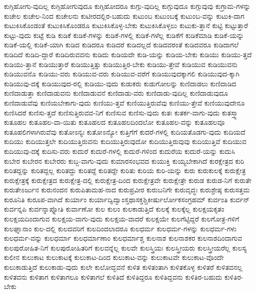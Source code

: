 {ಕುಗ್ಗಿಹೋಗು-ವುದಿಲ್ಲ
ಕುಗ್ಗಿಹೋಗುವುದೂ
ಕುಗ್ಗಿಹೋದರೂ
ಕುಗ್ಗು-ವುದಿಲ್ಲ
ಕುಗ್ಗುವುದೂ
ಕುಗ್ಗುವುವು
ಕುಗ್ರಾಮ-ಗಳನ್ನು
ಕುಚೇಲ
ಕುಚೇಲ-ನಿಂದ
ಕುಚೇಲನು
ಕುಟೀರದಲ್ಲಿರ-ಬಹುದು
ಕುಟುಂಬ
ಕುಟುಂಬಕ್ಕೆ
ಕುಟುಂಬ-ವನ್ನು
ಕುಟುಕಿ-ದಾಗ
ಕುಟುಕಿಸಿಕೊಂಡಂತೆ
ಕುಟುಕಿಸಿಕೊಂಡರೂ
ಕುಟುಕಿಸಿಕೊಳ್ಳ-ಬೇಕು
ಕುಟುಕಿಸಿಕೊಳ್ಳಲು
ಕುಟುಕು-ತ್ತಾನೆ
ಕುಟ್ಟಿ
ಕುಟ್ಟುತ್ತಾರೆ
ಕುಟ್ಟು-ವುದು
ಕುಟ್ಟೆ
ಕುಡಿ
ಕುಡಿಕೆ
ಕುಡಿಕೆ-ಗಳನ್ನು
ಕುಡಿಕೆ-ಗಳಲ್ಲಿ
ಕುಡಿಕೆ-ಗಳೆಲ್ಲ
ಕುಡಿಕೆಗೆ
ಕುಡಿಕೆಮಾಡಿ
ಕುಡಿಕೆ-ಯನ್ನು
ಕುಡಿಕೆ-ಯಲ್ಲಿ
ಕುಡಿಕೆ-ಯಾಗಿ
ಕುಡಿದ
ಕುಡಿದರೂ
ಕುಡಿದರೆ
ಕುಡಿದಲ್ಲದೆ
ಕುಡಿದವರಂತೆ
ಕುಡಿದವರೂ
ಕುಡಿದಾಗಲೆ
ಕುಡಿದಿದೆ
ಕುಡಿದಿ-ದ್ದಾರೆ
ಕುಡಿದಿರುವವನು
ಕುಡಿದು
ಕುಡಿಯದೇ
ಕುಡಿ-ಯನ್ನು
ಕುಡಿಯ-ಬೇಕು
ಕುಡಿಯು
ಕುಡಿಯು-ತ್ತದೆ
ಕುಡಿಯು-ತ್ತಾನೆ
ಕುಡಿಯುತ್ತಾರೆ
ಕುಡಿಯುತ್ತಿತ್ತು
ಕುಡಿಯುತ್ತಿರ-ಬೇಕು
ಕುಡಿಯು-ತ್ತೇವೆ
ಕುಡಿಯುವ
ಕುಡಿಯುವನು
ಕುಡಿಯುವನೊ
ಕುಡಿಯು-ವರು
ಕುಡಿಯುವ-ವರು
ಕುಡಿಯುವ-ವರೆಗೆ
ಕುಡಿಯುವುದಕ್ಕಾಗಲಿ
ಕುಡಿಯುವುದ-ಕ್ಕಾಗಿ
ಕುಡಿಯುವು-ದಕ್ಕೆ
ಕುಡಿಯುವುದ-ರಲ್ಲಿ
ಕುಡಿಯು-ವುದು
ಕುಡುಕರು
ಕುಡುಗೋಲನ್ನು
ಕುಣಿದಾಡಲು
ಕುಣಿದಾಡಿದ
ಕುಣಿದಾಡುತ್ತಾ
ಕುಣಿದಾಡುವನು
ಕುಣಿದಾಡುವನೆ
ಕುಣಿದಾಡು-ವರು
ಕುಣಿದಾಡು-ವುದಿಲ್ಲ
ಕುಣಿದಾಡುವುದೂ
ಕುಣಿದಾಡುವೆವು
ಕುಣಿಯಬೇಕಾಗು-ವುದು
ಕುಣಿಯು-ತ್ತವೆ
ಕುಣಿಯುತ್ತಿರುವೆವು
ಕುಣಿಯು-ತ್ತೇವೆ
ಕುಣಿಯುವುದೇನೂ
ಕುಣಿಸಿದರೆ
ಕುಣಿಸು-ತ್ತದೆ
ಕುಣಿಸುತ್ತಿರುವವ-ನಿಗೆ
ಕುಣಿಸುವ
ಕುಣಿಸು-ವುದು
ಕುತಃ
ಕುತರ್ಕ-ವಾಗು-ವುದು
ಕುತಸ್ತ್ವಾ
ಕುತೂಹಲ
ಕುತೂಹಲ-ವಾ-ಯಿತು
ಕುತೂಹಲದ
ಕುತೂಹಲದಿಂದಲೋ
ಕುತೂಹಲ-ವನ್ನು
ಕುತೂಹಲವೂ
ಕುತೂಹಲಿಗಳಾಗಿರುವೆವು
ಕುತೋಽನ್ಯಃ
ಕುತೋಽನ್ಯೋ
ಕುತ್ತಿಗೆಗೆ
ಕುದರೆ-ಗಳಲ್ಲಿ
ಕುದಿಯತೊಡಗು-ವುದು
ಕುದಿಯದೆ
ಕುದಿಯು
ಕುದಿಯುತ್ತಲೇ
ಕುದಿಯುತ್ತಿರುವನು
ಕುದಿಯುತ್ತಿರುವುದೋ
ಕುದಿಯುತ್ತಿರುವುವು
ಕುದಿಯುತ್ತಿವೆ
ಕುದಿಯುವ
ಕುದಿಯುವು-ದಕ್ಕೆ
ಕುದಿಸು-ವರು
ಕುದುರೆ
ಕುದುರೆ-ಗಳಲ್ಲಿ
ಕುದುರೆ-ಗಳಿಂದ
ಕುದುರೆಯ
ಕುದುರೆ-ಯನ್ನು
ಕುದುಸಿ
ಕುಬೇರ
ಕುಬೇರನ
ಕುಬೇರರು
ಕುಬ್ಜ-ವಾಗು-ವುದು
ಕುಮಾರಸಂಭವದ
ಕುಯುಕ್ತಿ
ಕುಯ್ಯಬೇಕಾಗಿದೆ
ಕುರಕ್ಷೇತ್ರದ
ಕುರಿ
ಕುರಿತದ್ದನ್ನು
ಕುರಿತದ್ದಲ್ಲ
ಕುರಿತದ್ದು
ಕುರಿತದ್ದೆ
ಕುರಿತದ್ದೇ
ಕುರಿತು
ಕುರಿಯ
ಕುರಿ-ಯನ್ನು
ಕುರು
ಕುರುಕುಲಕ್ಕೆ
ಕುರುಕ್ಷೇತ್ರ
ಕುರುಕ್ಷೇತ್ರಕ್ಕೆ
ಕುರುಕ್ಷೇತ್ರದ
ಕುರುಕ್ಷೇತ್ರ-ದಲ್ಲಿ
ಕುರುಕ್ಷೇತ್ರ-ದಿಂದ
ಕುರುಕ್ಷೇತ್ರವೇ
ಕುರುಕ್ಷೇತ್ರೇ
ಕುರುಡ
ಕುರುಡ-ನಿಗೆ
ಕುರುತೇ
ಕುರುತೇಽರ್ಜುನ
ಕುರುನಂದನ
ಕುರುಪಿತಾಮಹ-ನಾದ
ಕುರುಪ್ರವೀರ
ಕುರುಬನಿಗೇ
ಕುರುವೃದ್ಧಃ
ಕುರುಶ್ರೇಷ್ಠ
ಕುರುಸತ್ತಮ
ಕುರೂನಿತಿ
ಕುರೂಪ-ವಾಗಿದೆ
ಕುರ್ಯಾಂ
ಕುರ್ಯಾದ್ವಿದ್ವಾಂಸ್ತಥಾಸಕ್ತಶ್ಚಿಕೀರ್ಷುರ್ಲೋಕಸಂಗ್ರಹಮ್
ಕುರ್ವಂತಿ
ಕುರ್ವನ್
ಕುರ್ವನ್ನಪಿ
ಕುರ್ವನ್ನಾಪ್ನೋತಿ
ಕುರ್ವಾಣೋ
ಕುಲ
ಕುಲಂ
ಕುಲಕಾಡುತ್ತಿದೆ
ಕುಲಕ್ಕೆ
ಕುಲಕ್ಕೆಲ್ಲ
ಕುಲಕ್ಷಯಕೃತಂ
ಕುಲಕ್ಷಯದಿಂದಾಗುವ
ಕುಲಕ್ಷಯ-ವಾಗು-ವುದು
ಕುಲಕ್ಷಯ-ವಾದರೆ
ಕುಲಕ್ಷಯೇ
ಕುಲಗೆಟ್ಟಿದ್ದರೆ
ಕುಲಗೋತ್ರ-ಗಳಿಗೆ
ಕುಲಘ್ನಾನಾಂ
ಕುಲ-ದಲ್ಲಿ
ಕುಲದವರಿಗೆ
ಕುಲದಿಂದಲಾದರೂ
ಕುಲಧರ್ಮ
ಕುಲಧರ್ಮ-ಗಳನ್ನು
ಕುಲಧರ್ಮ-ಗಳು
ಕುಲಧರ್ಮ-ವನ್ನು
ಕುಲಧರ್ಮಾ
ಕುಲಧರ್ಮಾಣಾಂ
ಕುಲಧರ್ಮಾಶ್ಚ
ಕುಲನಾಶ
ಕುಲನಾಶಕರ
ಕುಲನಾಶದಿಂದಾಗುವ
ಕುಲಪುರೋಹಿತ-ನಿಗೆ
ಕುಲಪುರೋಹಿತರಿಗೆ
ಕುಲವನ್ನೆಲ್ಲ
ಕುಲವೇ
ಕುಲಸ್ತ್ರಿಯಃ
ಕುಲಸ್ತ್ರೀಯರು
ಕುಲಸ್ತ್ರೀಯರೆಲ್ಲ
ಕುಲಸ್ಯ
ಕುಲೀನ
ಕುಲುಕಾಟ
ಕುಲುಕಾಟಕ್ಕೆ
ಕುಲುಕಾಟ-ದಿಂದ
ಕುಲುಕಾಟ-ವನ್ನು
ಕುಲುಕಾಟವೇ
ಕುಲುಕಾಟ-ವೊಂದೇ
ಕುಲುಕಾಡುತ್ತಿದೆ
ಕುಲುಕಾಡು-ವುದು
ಕುಲೇ
ಕುಲೋದ್ಭವನೆ
ಕುಳಿತ
ಕುಳಿತಂತಾಗಿ
ಕುಳಿತಕೊಳ್ಳ
ಕುಳಿತರೆ
ಕುಳಿತವನಲ್ಲ
ಕುಳಿತವನು
ಕುಳಿತಾಗ
ಕುಳಿತಾಗಲೂ
ಕುಳಿತಾಗಲೆ
ಕುಳಿತಿದೆ
ಕುಳಿತಿದ್ದರೂ
ಕುಳಿತಿದ್ದವನು
ಕುಳಿತಿರ-ಬಹುದು
ಕುಳಿತಿರ-ಬೇಕು
}
